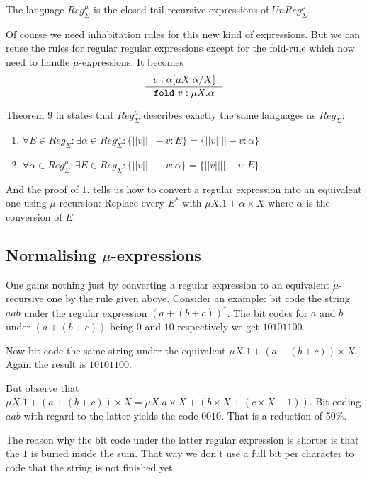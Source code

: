 \documentclass[a4paper, oneside]{memoir}
\theoremstyle{definition}
\begin{document}
The language $Reg_{\Sigma}^{\mu}$ is the closed tail-recursive expressions of
$UnReg_{\Sigma}^{\mu}$.

Of course we need inhabitation rules for this new kind of expressions. But we
can reuse the rules for regular regular expressions except for the fold-rule
which now need to handle $\mu$-expressions. It becomes
\[
\inference{v : \alpha \lbrack \mu X. \alpha / X \rbrack}{\mathtt{fold}\ v : \mu X. \alpha}
\]

Theorem 9 in \cite{heli10} states that $Reg_{\Sigma}^{\mu}$ describes exactly
the same languages as $Reg_{\Sigma}$:
\begin{enumerate}
\item $\forall E \in Reg_{\Sigma} : \exists \alpha \in Reg_{\Sigma}^{\mu} :
  \{||v|| | |- v : E\} = \{||v|| | |- v : \alpha \}$
\item $\forall \alpha \in Reg_{\Sigma}^{\mu} : \exists E \in Reg_{\Sigma} :
  \{||v|| | |- v : \alpha\} = \{||v|| | |- v : E \}$
\end{enumerate}

And the proof of $1.$ tells us how to convert a regular expression into an
equivalent one using $\mu$-recursion: Replace every $E^{\ast}$ with $\mu X.1 +
\alpha \times X$ where $\alpha$ is the conversion of $E$.

\subsection{Normalising $\mu$-expressions}

One gains nothing just by converting a regular expression to an equivalent
$\mu$-recursive one by the rule given above. Consider an example: bit code the
string $aab$ under the regular expression $(a + (b + c))^{\ast}$. The bit codes
for $a$ and $b$ under $(a + (b + c))$ being $0$ and $10$ respectively we get
$10101100$.

Now bit code the same string under the equivalent $\mu X. 1 + (a + (b + c))
\times X$. Again the result is $10101100$.

But observe that $\mu X. 1 + (a + (b + c)) \times X = \mu X. a \times X + (b
\times X + (c \times X + 1))$. Bit coding $aab$ with regard to the latter yields
the code $0010$. That is a reduction of 50\%.

The reason why the bit code under the latter regular expression is shorter is
that the $1$ is buried inside the sum. That way we don't use a full bit per
character to code that the string is not finished yet.
\end{document}
